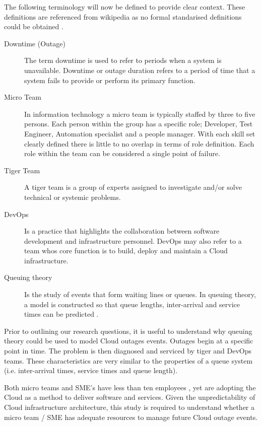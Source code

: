 \documentclass[5p]{elsarticle}
\begin{document}
The following terminology will now be defined to provide clear context. These definitions are referenced from wikipedia as no formal standarised definitions could be obtained \cite{wikidef}.

\begin{description}
 \item [Downtime (Outage)] The term downtime is used to refer to periods when a system is unavailable. Downtime or outage duration refers to a period of time that a system fails to provide or perform its primary function. 
 \item  [Micro Team] In information technology a micro team is typically staffed by three to five persons. Each person within the group has a specific role; Developer, Test Engineer, Automation specialist and a people manager. With each skill set clearly defined there is little to no overlap in terms of role definition. Each role within the team can be considered a single point of failure.
  \item [Tiger Team] A tiger team is a group of experts assigned to investigate and/or solve technical or systemic problems. 
 \item [DevOps] Is a practice that highlights the collaboration between software development and infrastructure personnel. DevOps may also refer to a team whos core function is to build, deploy and maintain a Cloud infrastructure. 
 \item [Queuing theory] Is the study of events that form waiting lines or queues. In queuing theory, a model is constructed so that queue lengths, inter-arrival and service times can be predicted \cite{sundarapandian2009probability}.
\end{description}

Prior to outlining our research questions, it is useful to understand why queuing theory could be used to model Cloud outages events. Outages begin at a specific point in time. The problem is then diagnosed and serviced by tiger and DevOps teams. These characteristics are very similar to the properties of a queue system (i.e. inter-arrival times, service times and queue length). 

Both micro teams and SME's have less than ten employees \cite{eusmereport2015}, yet are adopting the Cloud as a method to deliver software and services. Given the unpredictability of Cloud infrastructure architecture, this study is required to understand whether a micro team / SME has adequate resources to manage future Cloud outage events. 
\end{document}
